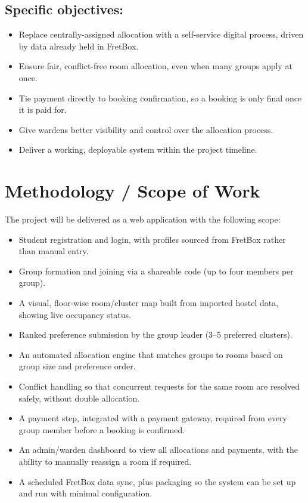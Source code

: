 \documentclass[11pt]{article}
\begin{document}
\subsection*{Specific objectives:}
\begin{itemize}[leftmargin=1.2cm]
    \item Replace centrally-assigned allocation with a self-service digital process, driven by data already held in FretBox.
    \item Ensure fair, conflict-free room allocation, even when many groups apply at once.
    \item Tie payment directly to booking confirmation, so a booking is only final once it is paid for.
    \item Give wardens better visibility and control over the allocation process.
    \item Deliver a working, deployable system within the project timeline.
\end{itemize}

\section{Methodology / Scope of Work}
The project will be delivered as a web application with the following scope:
\begin{itemize}[leftmargin=1.2cm]
    \item Student registration and login, with profiles sourced from FretBox rather than manual entry.
    \item Group formation and joining via a shareable code (up to four members per group).
    \item A visual, floor-wise room/cluster map built from imported hostel data, showing live occupancy status.
    \item Ranked preference submission by the group leader (3--5 preferred clusters).
    \item An automated allocation engine that matches groups to rooms based on group size and preference order.
    \item Conflict handling so that concurrent requests for the same room are resolved safely, without double allocation.
    \item A payment step, integrated with a payment gateway, required from every group member before a booking is confirmed.
    \item An admin/warden dashboard to view all allocations and payments, with the ability to manually reassign a room if required.
    \item A scheduled FretBox data sync, plus packaging so the system can be set up and run with minimal configuration.
\end{itemize}
\end{document}
